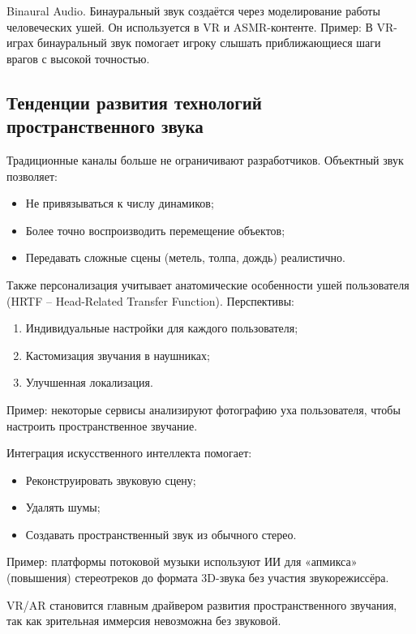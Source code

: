 \documentclass{ou}
\begin{document}
Binaural Audio. Бинауральный звук создаётся через моделирование работы человеческих ушей. Он используется в VR и ASMR-контенте. Пример: В VR-играх бинауральный звук помогает игроку слышать приближающиеся шаги врагов с высокой точностью.
\subsection{Тенденции развития технологий пространственного звука}
Традиционные каналы больше не ограничивают разработчиков. Объектный звук позволяет:
\begin{itemize}[label=-, leftmargin=0em, itemindent=3.35em, nosep]
\item Не привязываться к числу динамиков;
\item Более точно воспроизводить перемещение объектов;
\item Передавать сложные сцены (метель, толпа, дождь) реалистично.
\end{itemize}

Также персонализация учитывает анатомические особенности ушей пользователя (HRTF -- Head-Related Transfer Function). Перспективы:
\begin{enumerate}[leftmargin=0em, itemindent=3.75em, nosep, label=\arabic*)]
\item Индивидуальные настройки для каждого пользователя;
\item Кастомизация звучания в наушниках;
\item Улучшенная локализация.
\end{enumerate}

Пример: некоторые сервисы анализируют фотографию уха пользователя, чтобы настроить пространственное звучание.

Интеграция искусственного интеллекта помогает:
\begin{itemize}[label=-, leftmargin=0em, itemindent=3.35em, nosep]
\item Реконструировать звуковую сцену;
\item Удалять шумы;
\item Создавать пространственный звук из обычного стерео.
\end{itemize}

Пример: платформы потоковой музыки используют ИИ для «апмикса» (повышения) стереотреков до формата 3D-звука без участия звукорежиссёра.

VR/AR становится главным драйвером развития пространственного звучания, так как зрительная иммерсия невозможна без звуковой.
\end{document}

